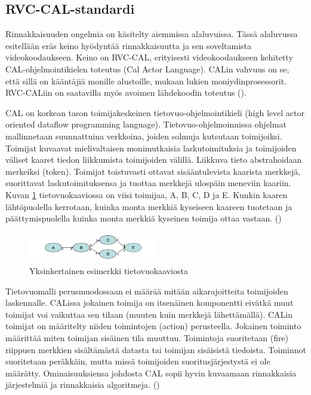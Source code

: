 \subsection{RVC-CAL-standardi}

Rinnakkaisuuden ongelmia on käsitelty aiemmissa alaluvuissa. Tässä
alaluvussa esitellään eräs keino hyödyntää rinnakkaisuutta ja sen soveltamista
videokoodaukseen. Keino on RVC-CAL, erityisesti videokoodaukseen kehitetty
CAL-ohjelmointikielen toteutus (Cal Actor Language). CALin vahvuus on se, että
sillä on kääntäjiä monille alustoille, mukaan lukien moniydinprosessorit.
RVC-CALiin on saatavilla myös avoimen lähdekoodin toteutus (\citealt{orcc}).

CAL on korkean tason toimijakeskeinen tietovuo-ohjelmointikieli (high level
actor oriented dataflow programming language). Tietovuo-ohjelmoinnissa ohjelmat
mallinnetaan suunnattuina verkkoina, joiden solmuja kutsutaan toimijoiksi.
Toimijat kuvaavat mielivaltaisen monimutkaisia laskutoimituksia ja toimijoiden
väliset kaaret tiedon liikkumista toimijoiden välillä. Liikkuva tieto
abstrahoidaan merkeiksi (token). Toimijat toistuvasti ottavat sisääntulevista kaarista
merkkejä, suorittavat laskutoimituksensa ja tuottaa merkkejä ulospäin
meneviin kaariin. Kuvan \ref{fig:dataflow} tietovuokaaviossa on viisi toimijaa,
A, B, C, D ja E. Kunkin kaaren lähtöpuolella kerrotaan, kuinka monta merkkiä
kyseiseen kaareen tuotetaan ja päättymispuolella kuinka monta merkkiä kyseinen
toimija ottaa vastaan. (\citealt{rvc})

\begin{figure}[ht]
	\centering
	\includegraphics[width=0.5\textwidth]{dataflow.jpg}
	\caption{Yksinkertainen esimerkki tietovuokaaviosta}
	\label{fig:dataflow}
\end{figure}

Tietovuomalli perusmuodossaan ei määrää mitään aikarajoitteita toimijoiden
laskennalle. CALissa jokainen toimija on itsenäinen komponentti eivätkä muut
toimijat voi vaikuttaa sen tilaan (muuten kuin merkkejä lähettämällä). CALin
toimijat on määritelty niiden toimintojen (action) perusteella. Jokainen
toiminto määrittää miten toimijan sisäinen tila muuttuu. Toimintoja
suoritetaan (fire) riippuen merkkien sisältämästä datasta tai toimijan
sisäisistä tiedoista. Toiminnot suoritetaan peräkkäin, mutta missä toimijoiden
suoritusjärjestystä ei ole määrätty. Ominaisuuksiensa johdosta CAL sopii hyvin 
kuvaamaan rinnakkaisia järjestelmiä ja rinnakkaisia algoritmeja. (\citealt{rvc})

